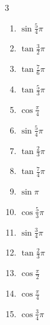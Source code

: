 \begin{multicols}{3}
\begin{enumerate}
  \item $\displaystyle \sin{\frac{5}{4}\pi}$

  \item $\displaystyle \tan{\frac{3}{2}\pi}$
        \phantom{$\displaystyle \quad なし$}

  \item $\displaystyle \tan{\frac{7}{6}\pi}$

  \item $\displaystyle \tan{\frac{5}{3}\pi}$

  \item $\displaystyle \cos{\frac{\pi}{4}}$

  \item $\displaystyle \sin{\frac{5}{4}\pi}$

  \item $\displaystyle \tan{\frac{2}{3}\pi}$

  \item $\displaystyle \tan{\frac{7}{4}\pi}$
        \phantom{$\displaystyle =-1$}

\columnbreak %

  \item $\displaystyle \sin{\pi}$
        \phantom{$\displaystyle =0$}

  \item $\displaystyle \cos{\frac{5}{3}\pi}$

  \item $\displaystyle \sin{\frac{3}{4}\pi}$

  \item $\displaystyle \tan{\frac{2}{3}\pi}$

  \item $\displaystyle \cos{\frac{\pi}{2}}$
        \phantom{$\displaystyle =0$}

  \item $\displaystyle \cos{\frac{\pi}{4}}$

  \item $\displaystyle \cos{\frac{3}{4}\pi}$


\end{enumerate}
\end{multicols}
